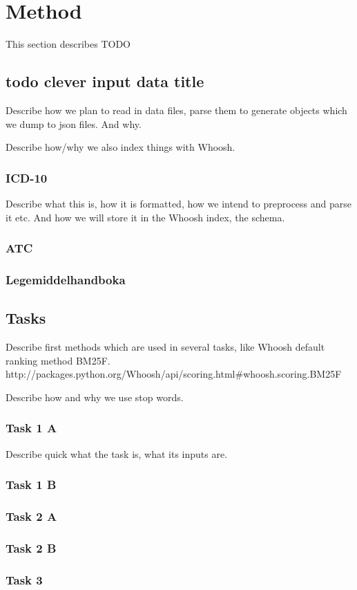 \chapter{Method}
This section describes TODO


\section{todo clever input data title}
Describe how we plan to read in data files, parse them to generate objects
which we dump to json files. And why.

Describe how/why we also index things with Whoosh.

\subsection{ICD-10}
Describe what this is, how it is formatted, how we intend to preprocess and
parse it etc. And how we will store it in the Whoosh index, the schema.

\subsection{ATC}

\subsection{Legemiddelhandboka} %


\section{Tasks}
Describe first methods which are used in several tasks, like Whoosh default
ranking method BM25F.
http://packages.python.org/Whoosh/api/scoring.html#whoosh.scoring.BM25F

Describe how and why we use stop words.

\subsection{Task 1 A}
Describe quick what the task is, what its inputs are.

\subsection{Task 1 B}

\subsection{Task 2 A}

\subsection{Task 2 B}

\subsection{Task 3}


